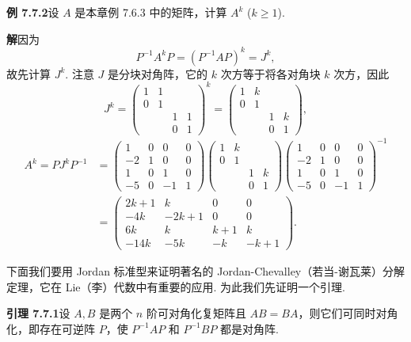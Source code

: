 \documentclass[UTF8, 12pt, fontset=fandol, oneside]{ctexart}
\begin{document}
\noindent\textbf{例 7.7.2}\quad 设 $A$ 是本章例 7.6.3 中的矩阵，计算 $A^k$ ($k\geq 1$).

\noindent\textbf{解}\quad 因为
\[
P^{-1}A^kP=(P^{-1}AP)^k=J^k,
\]
故先计算 $J^k$. 注意 $J$ 是分块对角阵，它的 $k$ 次方等于将各对角块 $k$ 次方，因此
\[
J^k=\left(\begin{array}{cccc}
1 & 1 & & \\
0 & 1 & & \\
& & 1 & 1\\
& & 0 & 1
\end{array}\right)^k
=\left(\begin{array}{cccc}
1 & k & & \\
0 & 1 & & \\
& & 1 & k\\
& & 0 & 1
\end{array}\right),
\]
\[
\begin{aligned}
A^k=PJ^kP^{-1}
&=\left(\begin{array}{cccc}
1 & 0 & 0 & 0\\
-2 & 1 & 0 & 0\\
1 & 0 & 1 & 0\\
-5 & 0 & -1 & 1
\end{array}\right)
\left(\begin{array}{cccc}
1 & k & & \\
0 & 1 & & \\
& & 1 & k\\
& & 0 & 1
\end{array}\right)
\left(\begin{array}{cccc}
1 & 0 & 0 & 0\\
-2 & 1 & 0 & 0\\
1 & 0 & 1 & 0\\
-5 & 0 & -1 & 1
\end{array}\right)^{-1}\\
&=\left(\begin{array}{cccc}
2k+1 & k & 0 & 0\\
-4k & -2k+1 & 0 & 0\\
6k & k & k+1 & k\\
-14k & -5k & -k & -k+1
\end{array}\right).
\end{aligned}
\]

下面我们要用 Jordan 标准型来证明著名的 Jordan-Chevalley（若当-谢瓦莱）分解定理，它在 Lie（李）代数中有重要的应用. 为此我们先证明一个引理.

\noindent\textbf{引理 7.7.1}\quad 设 $A,B$ 是两个 $n$ 阶可对角化复矩阵且 $AB=BA$，则它们可同时对角化，即存在可逆阵 $P$，使 $P^{-1}AP$ 和 $P^{-1}BP$ 都是对角阵.
\end{document}

